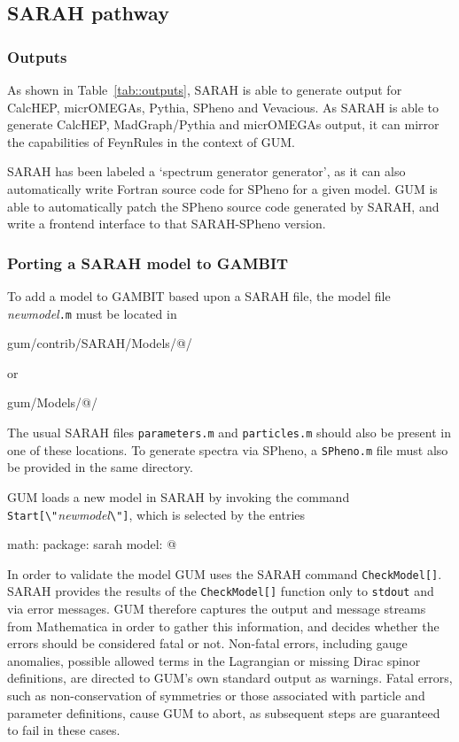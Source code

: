 \documentclass[pdftex,twocolumn,epjc3_preprint,runningheads]{svjour3}
\renewcommand{\_}{\discretionary{\underscore}{}{\underscore}}
\newcommand\term[1]{{\lstset{style=terminal}\lstinline!#1!\lstset{style=cpp}}}
\newcommand\mathematica[1]{{\lstset{style=Mathematica}\lstinline!#1!\lstset{style=cpp}}}
\newcommand{\metavarf}[1]{\textit{\color{darkgreen}\footnotesize\textrm{#1}}}
\newcommand{\metavar}{\metavarf}
\newcommand{\gambit}{\textsf{GAMBIT}\xspace}
\newcommand{\GB}{\gambit}
\newcommand{\pythia}{\textsf{Pythia}\xspace}
\newcommand{\mo}{\micromegas}
\newcommand{\micromegas}{\textsf{micrOMEGAs}\xspace}
\newcommand\Mathematica{\textsf{Mathematica}\xspace}
\newcommand{\gum}{\textsf{GUM}\xspace}
\newcommand{\dgum}{\!\!\term{.gum}\!\xspace}
\newcommand{\fr}{\textsf{FeynRules}\xspace}
\newcommand{\sarah}{\textsf{SARAH}\xspace}
\newcommand{\CH}{\textsf{CalcHEP}\xspace}
\newcommand{\MG}{\textsf{MadGraph}\xspace}
\newcommand{\veva}{\textsf{Vevacious}\xspace}
\newcommand{\spheno}{\textsf{SPheno}\xspace}
\newcommand\Fortran{\textsf{Fortran}\xspace}
\newcommand{\nm}{\metavar{new\_model}}
\begin{document}
\subsection{\sarah pathway} \label{sec:sarah}

\subsubsection{Outputs}

As shown in Table~\ref{tab::outputs}, \sarah is able to generate output for \CH, \mo, \pythia, \spheno and \veva. As \sarah is able to generate \CH, \MG/\pythia and \mo output, it can mirror the capabilities of \fr in the context of \gum.

\sarah has been labeled a `spectrum generator generator', as it can also automatically write \Fortran source code for \spheno for a given model. \gum is able to automatically patch the \spheno source code generated by \sarah, and write a frontend interface to that \sarah-\spheno version.

\subsubsection{Porting a \sarah model to \GB}

To add a model to \GB based upon a \sarah file, the model file \nm\term{.m} must be located in
%
\begin{lstterm}
gum/contrib/SARAH/Models/@\nm@/
\end{lstterm}
%
or
%
\begin{lstterm}
gum/Models/@\nm@/
\end{lstterm}
%
The usual \sarah files \term{parameters.m} and \term{particles.m} should also be present in one of these locations.  To generate spectra via \spheno, a \term{SPheno.m} file must also be provided in the same directory.

\gum loads a new model in \sarah by invoking the command \mathematica{Start[\"}\nm\mathematica{\"}\term{]}, which is selected by the \dgum entries

\begin{lstgum}
math:
  package: sarah
  model: @\nm@
\end{lstgum}

In order to validate the model \gum uses the \sarah command \mathematica{CheckModel[]}. \sarah provides the results of the \mathematica{CheckModel[]} function only to \term{stdout} and via error messages. \gum therefore captures the output and message streams from \Mathematica in order to gather this information, and decides whether the errors should be considered fatal or not. Non-fatal errors, including gauge anomalies, possible allowed terms in the Lagrangian or missing Dirac spinor definitions, are directed to \gum's own standard output as warnings. Fatal errors, such as non-conservation of symmetries or those associated with particle and parameter definitions, cause \gum to abort, as subsequent steps are guaranteed to fail in these cases.
\end{document}
